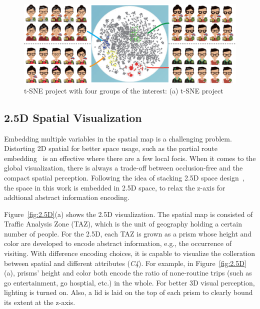\begin{figure}[htb!]
 \centering %
 \includegraphics[width=\columnwidth]{pictures/tsne}
 \caption{t-SNE project with four groups of the interest: (a) t-SNE project }
 \label{fig:tsne}
\end{figure}

\subsection{2.5D Spatial Visualization}


Embedding multiple variables in the spatial map is a challenging problem. Distorting 2D spatial for better space usage, such as the partial route embedding~\cite{sun2016embedding} is an effective where there are a few local focis. When it comes to the global visualization, there is always a trade-off between occlusion-free and the compact spatial perception. Following the idea of stacking 2.5D space design~\cite{Tominski2012_stacking}, the space in this work is embedded in 2.5D space, to relax the z-axis for addtional abstract information encoding.

Figure~\ref{fig:2.5D}(a) shows the 2.5D visualization. The spatial map is consisted of Traffic Analysis Zone (TAZ), which is the unit of geography holding a certain number of people. For the 2.5D, each TAZ is grown as a prism whose height and color are developed to encode abstract information, e.g., the occurrence of visiting. With difference encoding choices, it is capable to visualize the colleration between spatial and different attributes (\textit{C4}). For example, in Figure~\ref{fig:2.5D}(a), prisms' height and color both encode the ratio of none-routine trips (such as go entertainment, go hosptial, etc.) in the whole. For better 3D visual perception, lighting is turned on. Also, a lid is laid on the top of each prism to clearly bound its extent at the z-axis. 

